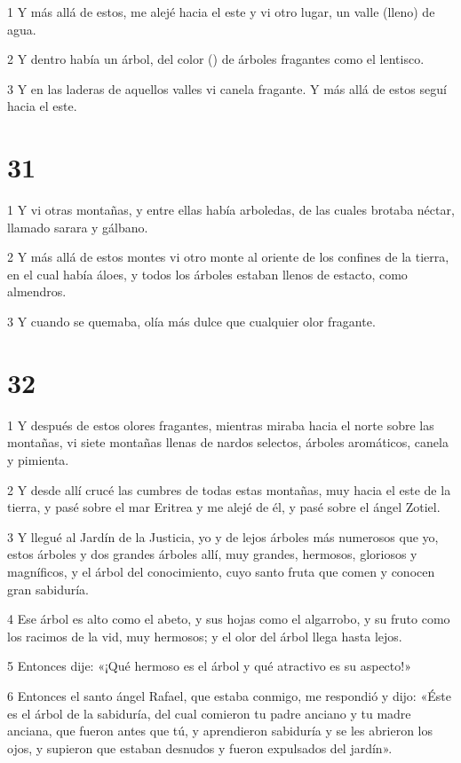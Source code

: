 \par 1 Y más allá de estos, me alejé hacia el este y vi otro lugar, un valle (lleno) de agua.
\par 2 Y dentro había un árbol, del color () de árboles fragantes como el lentisco.
\par 3 Y en las laderas de aquellos valles vi canela fragante. Y más allá de estos seguí hacia el este.

\chapter{31}

\par 1 Y vi otras montañas, y entre ellas había arboledas, de las cuales brotaba néctar, llamado sarara y gálbano.
\par 2 Y más allá de estos montes vi otro monte al oriente de los confines de la tierra, en el cual había áloes, y todos los árboles estaban llenos de estacto, como almendros.
\par 3 Y cuando se quemaba, olía más dulce que cualquier olor fragante.

\chapter{32}

\par 1 Y después de estos olores fragantes, mientras miraba hacia el norte sobre las montañas, vi siete montañas llenas de nardos selectos, árboles aromáticos, canela y pimienta.
\par 2 Y desde allí crucé las cumbres de todas estas montañas, muy hacia el este de la tierra, y pasé sobre el mar Eritrea y me alejé de él, y pasé sobre el ángel Zotiel.
\par 3 Y llegué al Jardín de la Justicia, yo y de lejos árboles más numerosos que yo, estos árboles y dos grandes árboles allí, muy grandes, hermosos, gloriosos y magníficos, y el árbol del conocimiento, cuyo santo fruta que comen y conocen gran sabiduría.
\par 4 Ese árbol es alto como el abeto, y sus hojas como el algarrobo, y su fruto como los racimos de la vid, muy hermosos; y el olor del árbol llega hasta lejos.
\par 5 Entonces dije: «¡Qué hermoso es el árbol y qué atractivo es su aspecto!»
\par 6 Entonces el santo ángel Rafael, que estaba conmigo, me respondió y dijo: «Éste es el árbol de la sabiduría, del cual comieron tu padre anciano y tu madre anciana, que fueron antes que tú, y aprendieron sabiduría y se les abrieron los ojos, y supieron que estaban desnudos y fueron expulsados ​​del jardín».

